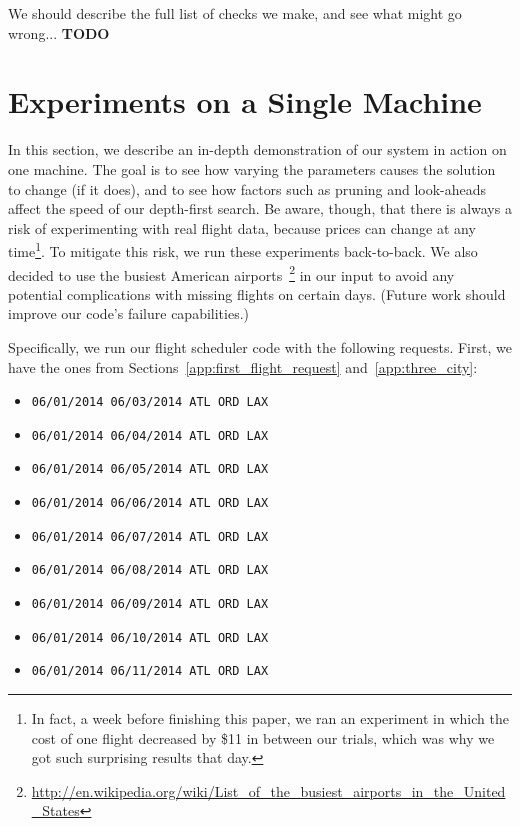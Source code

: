 \documentclass{article}
\begin{document}
We should describe the full list of checks we make, and see what might go wrong...
{\bf TODO}

\newpage
\section{Experiments on a Single Machine}\label{app:single_machine_experiment}

In this section, we describe an in-depth demonstration of our system in action on one machine. The goal is to see how varying the parameters causes
the solution to change (if it does), and to see how factors such as pruning and look-aheads affect the speed of our depth-first search. Be aware,
though, that there is always a risk of experimenting with real flight data, because prices can change at any time\footnote{In fact, a week before
finishing this paper, we ran an experiment in which the cost of one flight decreased by \$11 in between our trials, which was why we got such
surprising results that day.}. To mitigate this risk, we run these experiments back-to-back. We also decided to use the busiest American
airports~\footnote{\url{http://en.wikipedia.org/wiki/List\_of\_the\_busiest\_airports\_in\_the\_United\_States}} in our input to avoid any potential
complications with missing flights on certain days. (Future work should improve our code's failure capabilities.)

Specifically, we run our flight scheduler code with the following requests. First, we have the ones from Sections~\ref{app:first_flight_request}
and~\ref{app:three_city}:

\begin{itemize}[noitemsep]
    \item \texttt{06/01/2014 06/03/2014 ATL ORD LAX}
    \item \texttt{06/01/2014 06/04/2014 ATL ORD LAX}
    \item \texttt{06/01/2014 06/05/2014 ATL ORD LAX}
    \item \texttt{06/01/2014 06/06/2014 ATL ORD LAX}
    \item \texttt{06/01/2014 06/07/2014 ATL ORD LAX}
    \item \texttt{06/01/2014 06/08/2014 ATL ORD LAX}
    \item \texttt{06/01/2014 06/09/2014 ATL ORD LAX}
    \item \texttt{06/01/2014 06/10/2014 ATL ORD LAX}
    \item \texttt{06/01/2014 06/11/2014 ATL ORD LAX}
\end{itemize}
\end{document}
